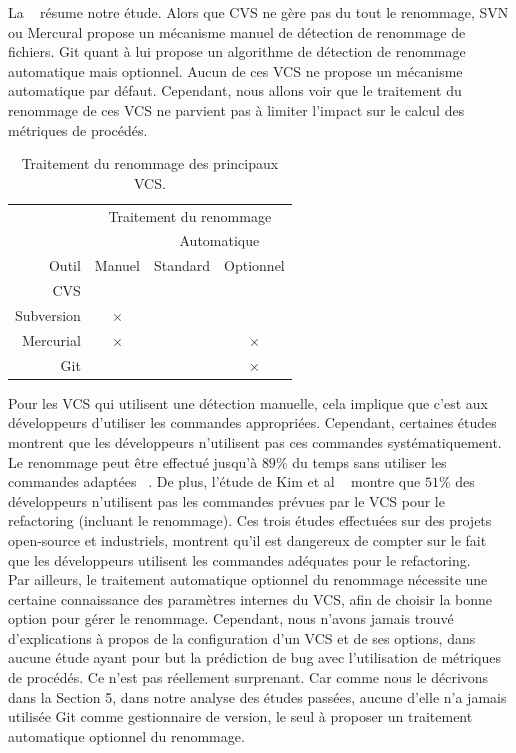 La ~ résume notre étude. Alors que CVS ne gère pas du tout le renommage, SVN ou Mercural propose un mécanisme manuel de détection de renommage de fichiers. Git quant à lui propose un algorithme de détection de renommage automatique mais optionnel. Aucun de ces VCS ne propose un mécanisme automatique par défaut. Cependant, nous allons voir que le traitement du renommage de ces VCS ne parvient pas à limiter l'impact sur le calcul des métriques de procédés.\\ 

\begin{table}[h]
\centering
\begin{tabular}{rccc}
\toprule
 & \multicolumn{3}{c}{Traitement du renommage}\\
\cmidrule{2-4}
& & \multicolumn{2}{c}{Automatique}\\
\cmidrule{3-4}
Outil & Manuel & Standard & Optionnel\\
\midrule
CVS & & &\\
Subversion & $\times$ & &\\
Mercurial & $\times$ & & $\times$\\
Git & & & $\times$\\
\bottomrule
\end{tabular}
\caption{Traitement du renommage des principaux VCS.}
\label{tab:vcs}
\end{table}

Pour les VCS qui utilisent une détection manuelle, cela implique que c'est aux développeurs d'utiliser les commandes appropriées. Cependant, certaines études montrent que les développeurs n'utilisent pas ces commandes systématiquement. Le renommage peut être effectué jusqu'à $89\%$ du temps sans utiliser les commandes adaptées ~\cite{lavoie_inferring_2012,steidl_incremental_2014}. De plus, l'étude de Kim et al ~\cite{kim_field_2012} montre que $51$\% des développeurs n'utilisent pas les commandes prévues par le VCS pour le refactoring (incluant le renommage). Ces trois études effectuées sur des projets open-source et industriels, montrent qu'il est dangereux de compter sur le fait que les développeurs utilisent les commandes adéquates pour le refactoring.\\

Par ailleurs, le traitement automatique optionnel du renommage nécessite une certaine connaissance des paramètres internes du VCS, afin de choisir la bonne option pour gérer le renommage. Cependant, nous n'avons jamais trouvé d'explications à propos de la configuration d'un VCS et de ses options, dans aucune étude ayant pour but la prédiction de bug avec l'utilisation de métriques de procédés. Ce n'est pas réellement surprenant. Car comme nous le décrivons dans la Section 5, dans notre analyse des études passées, aucune d'elle n'a jamais utilisée Git comme gestionnaire de version, le seul à proposer un traitement automatique optionnel du renommage.\\

